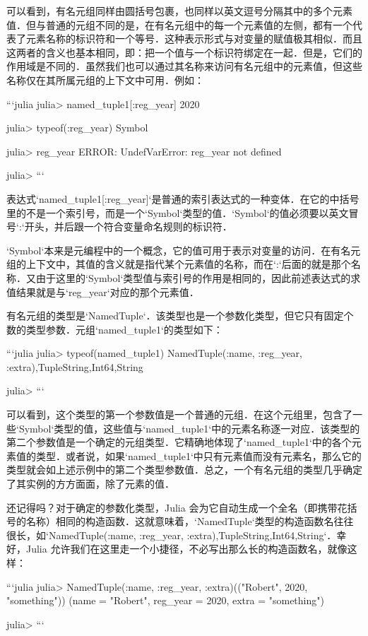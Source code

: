 可以看到，有名元组同样由圆括号包裹，也同样以英文逗号分隔其中的多个元素值．但与普通的元组不同的是，在有名元组中的每一个元素值的左侧，都有一个代表了元素名称的标识符和一个等号．这种表示形式与对变量的赋值极其相似．而且这两者的含义也基本相同，即：把一个值与一个标识符绑定在一起．但是，它们的作用域是不同的．虽然我们也可以通过其名称来访问有名元组中的元素值，但这些名称仅在其所属元组的上下文中可用．例如：

```julia
julia> named_tuple1[:reg_year]
2020

julia> typeof(:reg_year)
Symbol

julia> reg_year
ERROR: UndefVarError: reg_year not defined

julia> 
```

表达式`named_tuple1[:reg_year]`是普通的索引表达式的一种变体．在它的中括号里的不是一个索引号，而是一个`Symbol`类型的值．`Symbol`的值必须要以英文冒号`:`开头，并后跟一个符合变量命名规则的标识符．

`Symbol`本来是元编程中的一个概念，它的值可用于表示对变量的访问．在有名元组的上下文中，其值的含义就是指代某个元素值的名称，而在`:`后面的就是那个名称．又由于这里的`Symbol`类型值与索引号的作用是相同的，因此前述表达式的求值结果就是与`reg_year`对应的那个元素值．

有名元组的类型是`NamedTuple`．该类型也是一个参数化类型，但它只有固定个数的类型参数．元组`named_tuple1`的类型如下：

```julia
julia> typeof(named_tuple1)
NamedTuple{(:name, :reg_year, :extra),Tuple{String,Int64,String}}

julia> 
```

可以看到，这个类型的第一个参数值是一个普通的元组．在这个元组里，包含了一些`Symbol`类型的值，这些值与`named_tuple1`中的元素名称逐一对应．该类型的第二个参数值是一个确定的元组类型．它精确地体现了`named_tuple1`中的各个元素值的类型．或者说，如果`named_tuple1`中只有元素值而没有元素名，那么它的类型就会如上述示例中的第二个类型参数值．总之，一个有名元组的类型几乎确定了其实例的方方面面，除了元素的值．

还记得吗？对于确定的参数化类型，Julia 会为它自动生成一个全名（即携带花括号的名称）相同的构造函数．这就意味着，`NamedTuple`类型的构造函数名往往很长，如`NamedTuple{(:name, :reg_year, :extra),Tuple{String,Int64,String}}`．幸好，Julia 允许我们在这里走一个小捷径，不必写出那么长的构造函数名，就像这样：

```julia
julia> NamedTuple{(:name, :reg_year, :extra)}(("Robert", 2020, "something"))
(name = "Robert", reg_year = 2020, extra = "something")

julia> 
```

